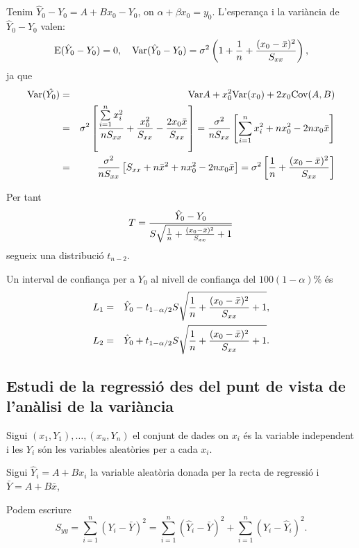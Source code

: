 Tenim $\hat{Y}_0 - Y_0 = A + B x_0 - Y_0$, on $\alpha + \beta x_0 = y_0$.
L'esperan\c{c}a i la vari\`ancia de $\hat{Y}_0 - Y_0$ valen:
$${\rm E}(\hat{Y}_0 - Y_0) = 0, \quad{\rm Var} (\hat{Y}_0 - Y_0) = \sigma^2 \left( 1 +
{1 \over n} + {(x_0 - \bar{x})^2 \over S_{xx}} \right),$$
ja que
\begin{eqnarray*}
{\rm Var} (\hat{Y_0}) & = &  {\rm Var} A + x_0^2 {\rm Var} (x_0) + 2 x_0 {\rm Cov} (A,B) \\ &=& \sigma^2 \left[
{\sum\limits_{i=1}^n x_i^2 \over n S_{xx}} + {x_0^2 \over S_{xx}} - {2 x_0
\bar{x} \over S_{xx}} \right] =   { \sigma^2  \over n S_{xx}}
 \left[\sum\limits_{i=1}^n x_i^2 + n x_0^2 - 2 n x_0 \bar{x} \right] 
\\ &=&  {\sigma^2 \over n S_{xx}} \left[ S_{xx} + n \bar{x}^2 + n x_0^2 - 2 n x_0 \bar{x} \right] =
\sigma^2 \left[ {1 \over n} + {(x_0 - \bar{x})^2 \over S_{xx}} \right]
\end{eqnarray*}

Per tant
$$T = {\hat{Y}_0 - Y_0 \over S \sqrt{{1 \over n} + {(x_0 - \bar{x})^2 \over
S_{xx}}+1}}$$
segueix una distribuci\'o $t_{n-2}$.

Un interval de confian\c ca per a $Y_0$ al nivell de confian\c ca del $100(1-\alpha) \%
$ \'es
\begin{eqnarray*}
L_1 & = & \hat{Y}_0 - t_{1 - \alpha/2} S \sqrt{{1 \over n} + {(x_0 - \bar{x})^2
\over S_{xx}} + 1}, \\
L_2 & = & \hat{Y}_0 + t_{1 - \alpha/2} S \sqrt{{1 \over n}
+ {(x_0 - \bar{x})^2 \over S_{xx}} + 1}.
\end{eqnarray*}

\subsection{Estudi de la regressi\'o des del punt de vista de l'an\`alisi de la
vari\`ancia}

Sigui $(x_1,Y_1), \ldots , (x_n,Y_n)$ el conjunt de dades on $x_i$ \'es la variable
independent i les $Y_i$ s\'on les variables aleat\`ories per a cada $x_i$.

Sigui $\hat{Y}_i = A + B x_i$ la variable aleat\`oria donada per la recta de
regressi\'o i $\bar{Y} = A + B \bar{x}$,

Podem escriure
$$S_{yy} = \sum\limits_{i=1}^n (Y_i - \bar{Y})^2 = \sum\limits_{i=1}^n 
(\hat{Y}_i - \bar{Y})^2 + \sum\limits_{i=1}^n (Y_i - \hat{Y}_i)^2.$$

